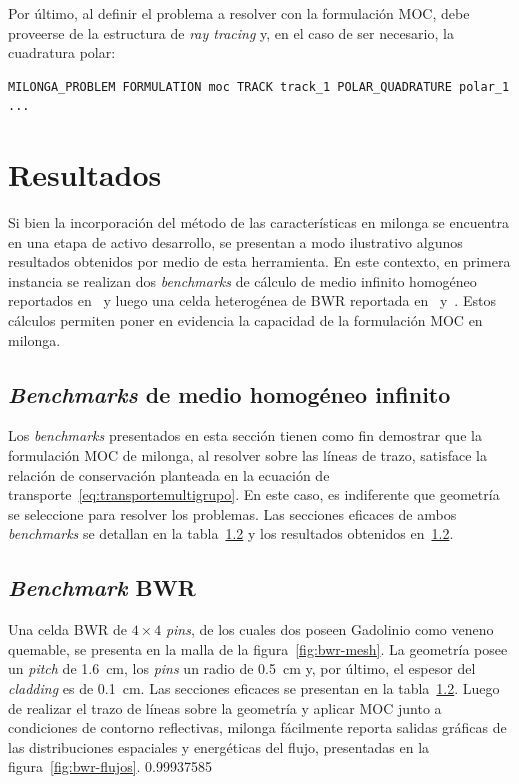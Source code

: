 \documentclass[11pt]{article}
\numberwithin{equation}{section}
\begin{document}
Por \'ultimo, al definir el problema a resolver con la formulación MOC, debe proveerse de la estructura de \emph{ray tracing} y, en el caso de ser necesario, la cuadratura polar:

\begin{lstlisting}[style=wasora]
MILONGA_PROBLEM FORMULATION moc TRACK track_1 POLAR_QUADRATURE polar_1 ...
\end{lstlisting}


\section{Resultados}

Si bien la incorporaci\'on del m\'etodo de las características en milonga se encuentra en una etapa de activo desarrollo, se presentan a modo ilustrativo algunos resultados obtenidos por medio de esta herramienta. En este contexto, en primera instancia se realizan dos \emph{benchmarks} de c\'alculo de medio infinito homog\'eneo reportados en~\cite{sood} y luego una celda heterog\'enea de BWR reportada en~\cite{hong} y~\cite{Mazumdar}. Estos c\'alculos permiten poner en evidencia la capacidad de la formulación MOC en milonga.

\subsection{\emph{Benchmarks} de medio homog\'eneo infinito}

Los \emph{benchmarks} presentados en esta sección tienen como fin demostrar que la formulación MOC de milonga, al resolver sobre las l\'ineas de trazo, satisface la relaci\'on de conservaci\'on planteada en la ecuación de transporte~\eqref{eq:transportemultigrupo}. En este caso, es indiferente que geometr\'ia se seleccione para resolver los problemas. Las secciones eficaces de ambos \emph{benchmarks} se detallan en la tabla~\ref{} y los resultados obtenidos en~\ref{}.

\subsection{\emph{Benchmark} BWR}

Una celda BWR de $\num{4} \times \num{4}$ \emph{pins}, de los cuales dos poseen Gadolinio como veneno quemable, se presenta en la malla de la figura~\ref{fig:bwr-mesh}. La geometr\'ia posee un \emph{pitch} de \SI{1.6}{\centi\metre}, los \emph{pins} un radio de \SI{0.5}{\centi\metre} y, por \'ultimo, el espesor del \emph{cladding} es de \SI{0.1}{\centi\metre}. Las secciones eficaces se presentan en la tabla~\ref{}. Luego de realizar el trazo de l\'ineas sobre la geometr\'ia y aplicar MOC junto a condiciones de contorno reflectivas, milonga f\'acilmente reporta salidas gr\'aficas de las distribuciones espaciales y energ\'eticas del flujo, presentadas en la figura~\ref{fig:bwr-flujos}. 0.99937585
\end{document}
